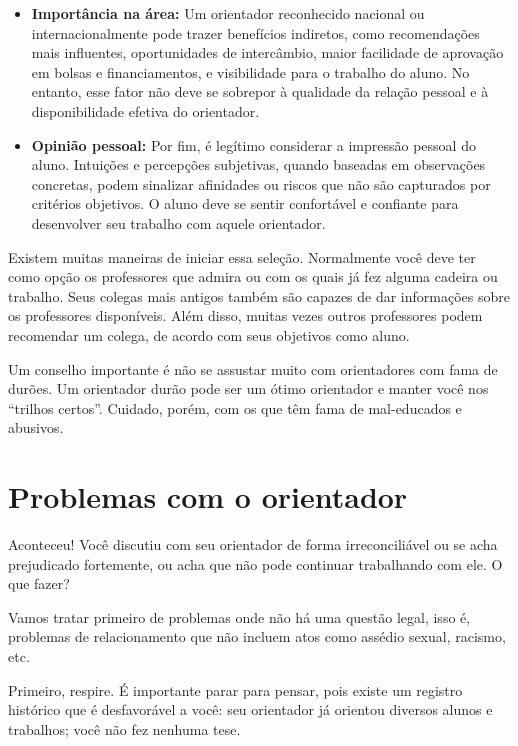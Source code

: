 \begin{itemize}
\item \textbf{Importância na área:} Um orientador reconhecido nacional ou internacionalmente pode trazer benefícios indiretos, como recomendações mais influentes, oportunidades de intercâmbio, maior facilidade de aprovação em bolsas e financiamentos, e visibilidade para o trabalho do aluno. No entanto, esse fator não deve se sobrepor à qualidade da relação pessoal e à disponibilidade efetiva do orientador.

\item \textbf{Opinião pessoal:} Por fim, é legítimo considerar a impressão pessoal do aluno. Intuições e percepções subjetivas, quando baseadas em observações concretas, podem sinalizar afinidades ou riscos que não são capturados por critérios objetivos. O aluno deve se sentir confortável e confiante para desenvolver seu trabalho com aquele orientador.

\end{itemize}


Existem muitas maneiras de iniciar essa seleção. Normalmente você deve ter como opção os professores que admira ou  com os quais já fez alguma cadeira ou trabalho. 
Seus colegas mais antigos também são capazes de dar informações sobre os professores disponíveis.
Além disso, muitas vezes outros professores podem recomendar um colega, de acordo com seus objetivos como aluno.


Um conselho importante é não se assustar muito com orientadores com fama de durões. 
Um orientador durão pode ser um ótimo orientador e manter você nos ``trilhos certos''. Cuidado, porém, com os que têm fama de mal-educados e abusivos.

\section{Problemas com o orientador}

Aconteceu! Você discutiu com seu orientador de forma irreconciliável ou se acha prejudicado fortemente, ou acha que não pode continuar trabalhando com ele. 
O que fazer?

Vamos tratar primeiro de problemas onde não há uma questão legal, isso é, problemas de relacionamento que não incluem atos como assédio sexual, racismo, etc.

Primeiro, respire. 
É importante parar para pensar, pois existe um registro histórico que é desfavorável a você: seu orientador já orientou diversos alunos e trabalhos; você não fez nenhuma tese.


